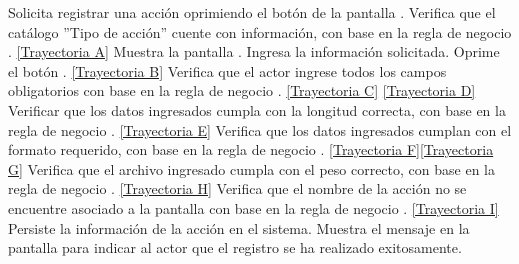 \begin{UCtrayectoria}
	\UCpaso[\UCactor] Solicita registrar una acción oprimiendo el botón  de la pantalla .
	\UCpaso[\UCsist] Verifica que el catálogo ''Tipo de acción'' cuente con información, con base en la regla de negocio . \hyperlink{CU11-1-1-1:TAA}{[Trayectoria A]}
	\UCpaso[\UCsist] Muestra la pantalla .
	\UCpaso[\UCactor] Ingresa la información solicitada. \label{CU11.1.1-P3}
	\UCpaso[\UCactor] Oprime el botón . \hyperlink{CU11-1-1-1:TAB}{[Trayectoria B]} 
	\UCpaso[\UCsist] Verifica que el actor ingrese todos los campos obligatorios con base en la regla de negocio . \hyperlink{CU11-1-1-1:TAC}{[Trayectoria C]} \hyperlink{CU11-1-1-1:TAD}{[Trayectoria D]}
	\UCpaso[\UCsist] Verificar que los datos ingresados cumpla con la longitud correcta, con base en la regla de negocio . \hyperlink{CU11-1-1-1:TAE}{[Trayectoria E]}
	\UCpaso[\UCsist] Verifica que los datos ingresados cumplan con el formato requerido, con base en la regla de negocio . \hyperlink{CU11-1-1-1:TAF}{[Trayectoria F]}\hyperlink{CU11-1-1-1:TAG}{[Trayectoria G]}
	\UCpaso[\UCsist] Verifica que el archivo ingresado cumpla con el peso correcto, con base en la regla de negocio . \hyperlink{CU11-1-1-1:TAH}{[Trayectoria H]}
	\UCpaso[\UCsist] Verifica que el nombre de la acción no se encuentre asociado a la pantalla con base en la regla de negocio . \hyperlink{CU11-1-1-1:TAI}{[Trayectoria I]}
	\UCpaso[\UCsist] Persiste la información de la acción en el sistema.
	\UCpaso[\UCsist] Muestra el mensaje  en la pantalla  para indicar al actor que el registro se ha realizado exitosamente.
\end{UCtrayectoria}		

